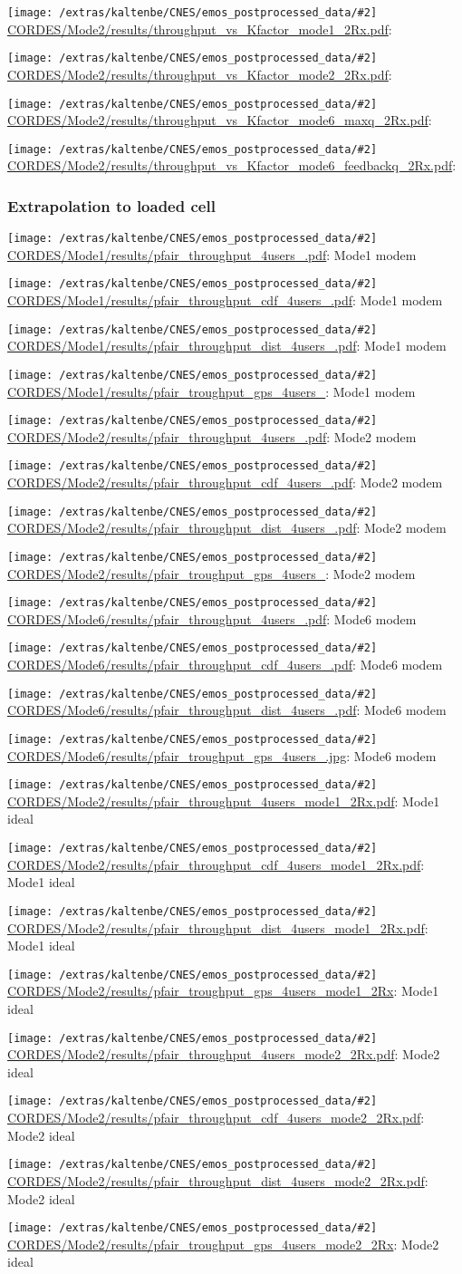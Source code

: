 \documentclass[a4paper,10pt]{article}
\newcommand{\printfile}[2][]{
 \begin{minipage}{8cm}
  \centering
  \texttt{[image: /extras/kaltenbe/CNES/emos\_postprocessed\_data/\#2]}
  \url{#2}: #1

 \end{minipage}
}
\begin{document}
\printfile{CORDES/Mode2/results/throughput_vs_Kfactor_mode1_2Rx.pdf}
\printfile{CORDES/Mode2/results/throughput_vs_Kfactor_mode2_2Rx.pdf}

\printfile{CORDES/Mode2/results/throughput_vs_Kfactor_mode6_maxq_2Rx.pdf}
\printfile{CORDES/Mode2/results/throughput_vs_Kfactor_mode6_feedbackq_2Rx.pdf}


\subsubsection{Extrapolation to loaded cell}

\printfile[Mode1 modem]{CORDES/Mode1/results/pfair_throughput_4users_.pdf}
\printfile[Mode1 modem]{CORDES/Mode1/results/pfair_throughput_cdf_4users_.pdf}

\printfile[Mode1 modem]{CORDES/Mode1/results/pfair_throughput_dist_4users_.pdf}
\printfile[Mode1 modem]{CORDES/Mode1/results/pfair_troughput_gps_4users_}

\printfile[Mode2 modem]{CORDES/Mode2/results/pfair_throughput_4users_.pdf}
\printfile[Mode2 modem]{CORDES/Mode2/results/pfair_throughput_cdf_4users_.pdf}

\printfile[Mode2 modem]{CORDES/Mode2/results/pfair_throughput_dist_4users_.pdf}
\printfile[Mode2 modem]{CORDES/Mode2/results/pfair_troughput_gps_4users_}

\printfile[Mode6 modem]{CORDES/Mode6/results/pfair_throughput_4users_.pdf}
\printfile[Mode6 modem]{CORDES/Mode6/results/pfair_throughput_cdf_4users_.pdf}

\printfile[Mode6 modem]{CORDES/Mode6/results/pfair_throughput_dist_4users_.pdf}
\printfile[Mode6 modem]{CORDES/Mode6/results/pfair_troughput_gps_4users_.jpg}

\printfile[Mode1 ideal]{CORDES/Mode2/results/pfair_throughput_4users_mode1_2Rx.pdf}
\printfile[Mode1 ideal]{CORDES/Mode2/results/pfair_throughput_cdf_4users_mode1_2Rx.pdf}

\printfile[Mode1 ideal]{CORDES/Mode2/results/pfair_throughput_dist_4users_mode1_2Rx.pdf}
\printfile[Mode1 ideal]{CORDES/Mode2/results/pfair_troughput_gps_4users_mode1_2Rx}

\printfile[Mode2 ideal]{CORDES/Mode2/results/pfair_throughput_4users_mode2_2Rx.pdf}
\printfile[Mode2 ideal]{CORDES/Mode2/results/pfair_throughput_cdf_4users_mode2_2Rx.pdf}

\printfile[Mode2 ideal]{CORDES/Mode2/results/pfair_throughput_dist_4users_mode2_2Rx.pdf}
\printfile[Mode2 ideal]{CORDES/Mode2/results/pfair_troughput_gps_4users_mode2_2Rx}
\end{document}
